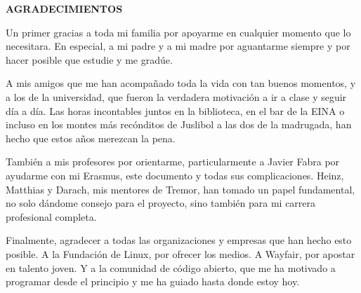 
\begin{center}
{\LARGE \bfseries AGRADECIMIENTOS}
\vspace{2.5cm}
\end{center}

Un primer gracias a toda mi familia por apoyarme en cualquier momento que lo
necesitara. En especial, a mi padre y a mi madre por aguantarme siempre y por
hacer posible que estudie y me gradúe.

A mis amigos que me han acompañado toda la vida con tan buenos momentos, y a los
de la universidad, que fueron la verdadera motivación a ir a clase y seguir día
a día. Las horas incontables juntos en la biblioteca, en el bar de la EINA o
incluso en los montes más recónditos de Juslibol a las dos de la madrugada, han
hecho que estos años merezcan la pena.

También a mis profesores por orientarme, particularmente a Javier Fabra por
ayudarme con mi Erasmus, este documento y todas sus complicaciones. Heinz,
Matthias y Darach, mis mentores de Tremor, han tomado un papel fundamental, no
solo dándome consejo para el proyecto, sino también para mi carrera profesional
completa.

Finalmente, agradecer a todas las organizaciones y empresas que han hecho esto
posible. A la Fundación de Linux, por ofrecer los medios. A Wayfair, por apostar
en talento joven. Y a la comunidad de código abierto, que me ha motivado a
programar desde el principio y me ha guiado hasta donde estoy hoy.
